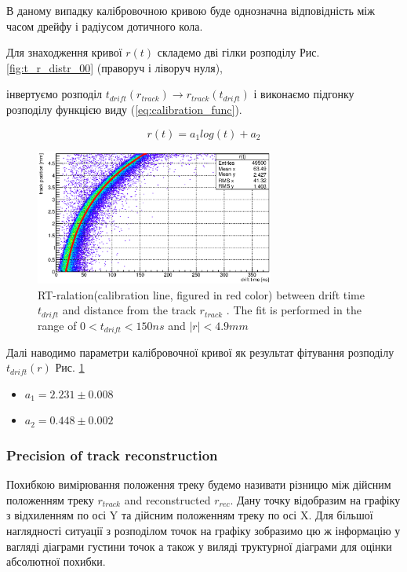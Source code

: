 \documentclass[]{article}
\begin{document}
	
	В даному випадку калібровочною кривою буде однозначна відповідність між часом дрейфу і радіусом дотичного кола.
	
	Для знаходження кривої $r(t)$ складемо дві гілки розподілу Рис. \ref{fig:t_r_distr_00} (праворуч і ліворуч нуля), 
	
	 інвертуємо розподіл $t_{drift}(r_{track}) \longrightarrow r_{track}(t_{drift})$ і виконаємо підгонку розподілу функцією виду (\ref{eq:calibration_func}).
	
	\begin{equation}
		\label{eq:calibration_func}
		r(t) = a_1 log(t) + a_2
	\end{equation}
	
	\begin{figure}[h]
	\includegraphics[width=0.7\textwidth]{rt_calibration.eps}
	\centering
	\caption{ RT-ralation(calibration line, figured in red color) between drift time $t_{drift}$ and distance from the  track $r_{track}$ .  The fit is performed in the range of
$0 < t_{drift} < 150 ns$ and $|r| < 4.9mm$ }
	\label{fig:calibration_00}
	\end{figure}
	
	Далі наводимо параметри калібровочної кривої як результат фітування розподілу $t_{drift}(r)$ Рис. \ref{fig:calibration_00} 
	
	\begin{itemize}
		\item $a_1 = 2.231 \pm 0.008$
		\item $a_2 = 0.448 \pm 0.002$
	\end{itemize}
	
	\subsubsection{Precision of track reconstruction}
	Похибкою вимірювання положення треку будемо називати різницю між дійсним положенням треку $r_{track}$ and reconstructed $r_{rec}$. Дану точку відобразим на графіку з відхиленням по осі Y та дійсним положенням треку по осі X. Для більшої наглядності ситуації з розподілом точок на графіку зобразимо цю ж інформацію у вагляді діаграми густини точок а також у виляді труктурної діаграми для  оцінки абсолютної похибки.
	
\end{document}
